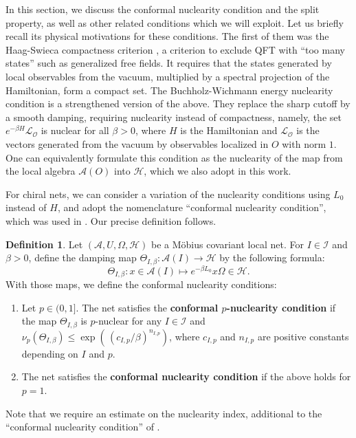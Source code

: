 \documentclass[a4paper,12pt]{article}
\theoremstyle{plain}
\theoremstyle{definition}
\newtheorem{defi}[theo]{Definition}
\theoremstyle{remark}
\def\A{{\mathcal A}}
\def\H{{\mathcal H}}
\begin{document}
In this section, we discuss the conformal nuclearity condition and the split property, as well as other related conditions
which we will exploit.
Let us briefly recall its physical motivations for these conditions. 
The first of them was the Haag-Swieca compactness criterion \cite{haaswi65},
a criterion to exclude QFT with ``too many states'' such as generalized free fields.
It requires that the states generated by local observables from the vacuum, multiplied by a spectral projection of the Hamiltonian,
form a compact set.
The Buchholz-Wichmann energy nuclearity condition \cite{bucwic86} is a strengthened version of the above.
They replace the sharp cutoff by a smooth damping, requiring nuclearity instead of compactness,
namely, the set $e^{-\beta H}\mathcal{L}_\mathcal{O}$ is nuclear for all $\beta > 0$,
where $H$ is the Hamiltonian and $\mathcal{L}_\mathcal{O}$ is the vectors generated from the vacuum by
observables localized in $O$ with norm $1$. One can equivalently formulate this condition
as the nuclearity of the map from the local algebra $\A(O)$ into $\H$, which we also adopt in this work.

For chiral nets, we can consider a variation of the nuclearity conditions using $L_0$ instead of $H$,
and adopt the nomenclature ``conformal nuclearity condition'', which was used in \cite{bdl07}. Our precise definition follows.

\begin{defi}%
\label{def:nuc} Let  $(\A,U,\Omega,\mathcal{H})$ be a M\"obius covariant local net.
For $I\in\mathcal{I}$ and $\beta>0$, define the damping map $\Theta_{I,\beta}: \A(I) \to \mathcal{H}$ by the following formula:
  \[
   \Theta_{I,\beta}: x\in\A(I) \mapsto e^{-\beta L_0}x\Omega \in \mathcal{H}.   
  \]
  With those maps, we define the conformal nuclearity conditions:
  \begin{enumerate}[(1)]
  \item \label{it:nucp} Let $p \in (0,1]$.
  The net satisfies the {\bf conformal $p$-nuclearity condition} if
  the map $\Theta_{I,\beta}$ is $p$-nuclear for any $I \in \mathcal{I}$ and $\nu_p(\Theta_{I,\beta}) \le \exp\left( \, (c_{I,p}/\beta)^{n_{I,p}} \right)$,
  where $c_{I,p}$ and $n_{I,p}$ are positive constants depending on $I$ and $p$.
  \item \label{it:nuc1} The net satisfies the {\bf conformal nuclearity condition} if the above holds for $p=1$.
\end{enumerate}\end{defi}
Note that we require an estimate on the nuclearity index, additional to
the ``conformal nuclearity condition'' of \cite[Section 6]{bdl07}.
\end{document}
